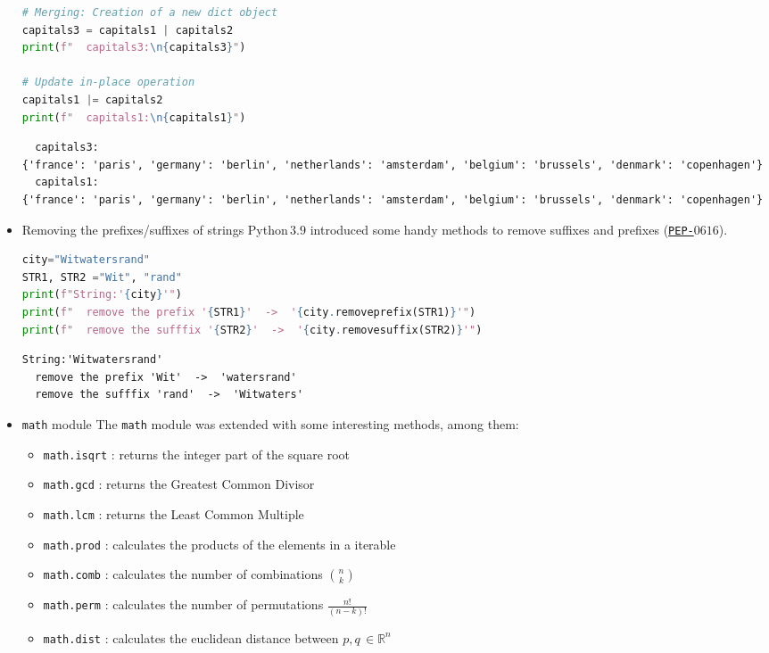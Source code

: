 \documentclass[10pt]{article}
\begin{document}
\begin{itemize}
\begin{lstlisting}[language=python]
# Merging: Creation of a new dict object
capitals3 = capitals1 | capitals2
print(f"  capitals3:\n{capitals3}")

# Update in-place operation
capitals1 |= capitals2
print(f"  capitals1:\n{capitals1}")
\end{lstlisting}

\begin{verbatim}
  capitals3:
{'france': 'paris', 'germany': 'berlin', 'netherlands': 'amsterdam', 'belgium': 'brussels', 'denmark': 'copenhagen'}
  capitals1:
{'france': 'paris', 'germany': 'berlin', 'netherlands': 'amsterdam', 'belgium': 'brussels', 'denmark': 'copenhagen'}
\end{verbatim}

\item Removing the prefixes/suffixes of strings\newline
Python\,$3.9$ introduced some handy methods to remove suffixes and prefixes 
(\href{https://peps.python.org/pep-0616/}{\texttt{PEP-}$0616$}).
\begin{lstlisting}[language=python]
city="Witwatersrand"
STR1, STR2 ="Wit", "rand"
print(f"String:'{city}'")
print(f"  remove the prefix '{STR1}'  ->  '{city.removeprefix(STR1)}'")
print(f"  remove the sufffix '{STR2}'  ->  '{city.removesuffix(STR2)}'")
\end{lstlisting}

\begin{verbatim}
String:'Witwatersrand'
  remove the prefix 'Wit'  ->  'watersrand'
  remove the sufffix 'rand'  ->  'Witwaters'
\end{verbatim}

\item \lstinline[language=python]{math} module \newline
The \lstinline[language=python]{math} module was extended with
some interesting methods, among them:
\begin{itemize}
\item \lstinline[language=python]{math.isqrt} : returns the integer part of the square root
\item \lstinline[language=python]{math.gcd}   : returns the Greatest Common Divisor
\item \lstinline[language=python]{math.lcm}   : returns the Least Common Multiple
\item \lstinline[language=python]{math.prod}  : calculates the products of the elements in a iterable
\item \lstinline[language=python]{math.comb}  : calculates the number of combinations $n \choose k$
\item \lstinline[language=python]{math.perm}  : calculates the number of permutations $\frac{n!}{(n-k)!}$
\item \lstinline[language=python]{math.dist}  : calculates the euclidean distance between $p,q \,\in \mathbb{R}^n$
\end{itemize}		


\end{itemize}
\end{document}
